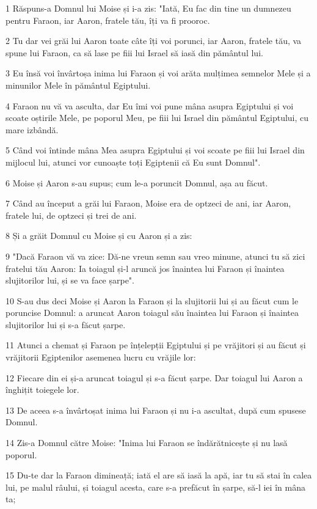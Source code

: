 \par 1 Răspuns-a Domnul lui Moise și i-a zis: "Iată, Eu fac din tine un dumnezeu pentru Faraon, iar Aaron, fratele tău, îți va fi prooroc.
\par 2 Tu dar vei grăi lui Aaron toate câte îți voi porunci, iar Aaron, fratele tău, va spune lui Faraon, ca să lase pe fiii lui Israel să iasă din pământul lui.
\par 3 Eu însă voi învârtoșa inima lui Faraon și voi arăta mulțimea semnelor Mele și a minunilor Mele în pământul Egiptului.
\par 4 Faraon nu vă va asculta, dar Eu îmi voi pune mâna asupra Egiptului și voi scoate oștirile Mele, pe poporul Meu, pe fiii lui Israel din pământul Egiptului, cu mare izbândă.
\par 5 Când voi întinde mâna Mea asupra Egiptului și voi scoate pe fiii lui Israel din mijlocul lui, atunci vor cunoaște toți Egiptenii că Eu sunt Domnul".
\par 6 Moise și Aaron s-au supus; cum le-a poruncit Domnul, așa au făcut.
\par 7 Când au început a grăi lui Faraon, Moise era de optzeci de ani, iar Aaron, fratele lui, de optzeci și trei de ani.
\par 8 Și a grăit Domnul cu Moise și cu Aaron și a zis:
\par 9 "Dacă Faraon vă va zice: Dă-ne vreun semn sau vreo minune, atunci tu să zici fratelui tău Aaron: Ia toiagul și-l aruncă jos înaintea lui Faraon și înaintea slujitorilor lui, și se va face șarpe".
\par 10 S-au dus deci Moise și Aaron la Faraon și la slujitorii lui și au făcut cum le poruncise Domnul: a aruncat Aaron toiagul său înaintea lui Faraon și înaintea slujitorilor lui și s-a făcut șarpe.
\par 11 Atunci a chemat și Faraon pe înțelepții Egiptului și pe vrăjitori și au făcut și vrăjitorii Egiptenilor asemenea lucru cu vrăjile lor:
\par 12 Fiecare din ei și-a aruncat toiagul și s-a făcut șarpe. Dar toiagul lui Aaron a înghițit toiegele lor.
\par 13 De aceea s-a învârtoșat inima lui Faraon și nu i-a ascultat, după cum spusese Domnul.
\par 14 Zis-a Domnul către Moise: "Inima lui Faraon se îndărătnicește și nu lasă poporul.
\par 15 Du-te dar la Faraon dimineață; iată el are să iasă la apă, iar tu să stai în calea lui, pe malul râului, și toiagul acesta, care s-a prefăcut în șarpe, să-l iei în mâna ta;
